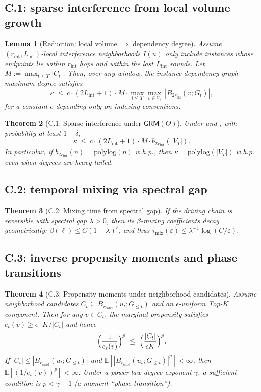 \documentclass[11pt]{article}
\newcommand{\E}{\mathbb{E}}
\newcommand{\1}{\mathbf{1}}
\newcommand{\polylog}{\mathrm{polylog}}
\theoremstyle{plain}
\newtheorem{theorem}{Theorem}[section]
\newtheorem{lemma}[theorem]{Lemma}
\theoremstyle{definition}
\theoremstyle{remark}
\begin{document}
\subsection{C.1: sparse interference from local volume growth}
\begin{lemma}[Reduction: local volume $\Rightarrow$ dependency degree]\label{lem:kappa_reduction}
Assume $(r_{\mathrm{int}},L_{\mathrm{int}})$-local interference neighborhoods $I(u)$ only include instances whose endpoints lie within
$r_{\mathrm{int}}$ hops and within the last $L_{\mathrm{int}}$ rounds.
Let $M:=\max_{t\le T}|C_t|$.
Then, over any window, the instance dependency-graph maximum degree satisfies
\[
\kappa \ \le\ c\cdot (2L_{\mathrm{int}}+1)\cdot M \cdot
\max_{t\le T}\max_{v\in V_t}\ |B_{2r_{\mathrm{int}}}(v;G_t)|,
\]
for a constant $c$ depending only on indexing conventions.
\end{lemma}

\begin{theorem}[C.1: Sparse interference under $\mathsf{GRM}(\Theta)$]\label{thm:C1}
Under  and , with probability at least $1-\delta$,
\[
\kappa \ \le\ c\cdot (2L_{\mathrm{int}}+1)\cdot M \cdot b_{2r_{\mathrm{int}}}(|V_T|).
\]
In particular, if $b_{2r_{\mathrm{int}}}(n)=\polylog(n)$ w.h.p., then $\kappa=\polylog(|V_T|)$ w.h.p.
even when degrees are heavy-tailed.
\end{theorem}

\subsection{C.2: temporal mixing via spectral gap}
\begin{theorem}[C.2: Mixing time from spectral gap]\label{thm:C2}
If the driving chain is reversible with spectral gap $\lambda>0$, then its $\beta$-mixing coefficients decay geometrically:
$\beta(\ell)\le C(1-\lambda)^\ell$, and thus $\tau_{\mathrm{mix}}(\varepsilon)\le \lambda^{-1}\log(C/\varepsilon)$.
\end{theorem}

\subsection{C.3: inverse propensity moments and phase transitions}
\begin{theorem}[C.3: Propensity moments under neighborhood candidates]\label{thm:C3}
Assume neighborhood candidates $C_t\subseteq B_{r_{\mathrm{cand}}}(u_t;G_{\le t})$ and an $\epsilon$-uniform Top-$K$ component.
Then for any $v\in C_t$, the marginal propensity satisfies $e_t(v)\ge \epsilon\cdot K/|C_t|$ and hence
\[
\Bigl(\frac{1}{e_t(v)}\Bigr)^p \ \le\ \Bigl(\frac{|C_t|}{\epsilon K}\Bigr)^p.
\]
If $|C_t|\le |B_{r_{\mathrm{cand}}}(u_t;G_{\le t})|$ and $\E[|B_{r_{\mathrm{cand}}}(u_t;G_{\le t})|^p]<\infty$,
then $\E[(1/e_t(v))^p]<\infty$.
Under a power-law degree exponent $\gamma$, a sufficient condition is $p<\gamma-1$ (a moment ``phase transition'').
\end{theorem}
\end{document}
